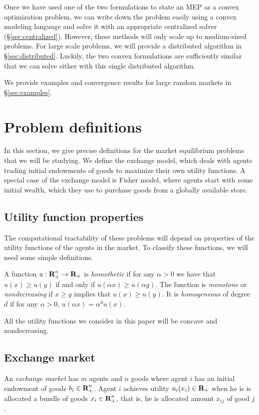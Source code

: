 \documentclass[12pt]{article}
\begin{document}
Once we have used one of the two formulations to state an MEP as a convex optimization problem,
we can write down the problem easily using a convex modeling language and solve it with an appropriate centralized solver (\S\ref{sec:centralized}). However, these methods will only scale up to medium-sized problems. For large scale problems, we will provide a distributed
algorithm in \S\ref{sec:distributed}. Luckily, the two convex formulations are sufficiently similar that we can solve either with this single distributed algorithm.

We provide examples and convergence results for large random markets in \S\ref{sec:examples}.


\section{Problem definitions}
\label{sec:defs}
In this section, we give precise definitions for the market equilibrium problems that we will be studying. We define the exchange model,
which deals with agents trading initial endowments of goods to maximize their own utility functions.
A special case of the exchange model is Fisher model, where agents
start with some initial wealth, which they use to purchase goods 
from a globally available store.

\subsection{Utility function properties}
The computational tractability of these problems will depend on properties of the
utility functions of the agents in the market.
To classify these functions, we will need some simple definitions.

A function $u: {\mbox{\bf R}}^n_+ \to {\mbox{\bf R}}_+$ is \emph{homothetic} if for any $\alpha > 0$ we have that $u(x) \geq u(y)$ if and only if
$u(\alpha x) \geq u(\alpha y)$.
The function is \emph{monotone} or \emph{nondecreasing} if $x \geq y$ implies that $u(x) \geq u(y)$.
It is \emph{homogeneous} of degree $d$ if for any $\alpha > 0$,
$u(\alpha x) = \alpha^d u(x)$.

All the utility functions we consider in this paper will
be concave and nondecreasing.

\subsection{Exchange market}
\label{sec:exchange_def}
An \emph{exchange market} has $m$ agents and $n$ goods where
agent $i$ has an initial endowment of goods $b_i \in {\mbox{\bf R}}_+^n$.
Agent $i$ achieves utility $u_i(x_i) \in {\mbox{\bf R}}_+$ when he is is allocated a
bundle of goods $x_i \in {\mbox{\bf R}}^n_{+}$,
that is, he is allocated amount $x_{ij}$ of good $j$.
\end{document}
